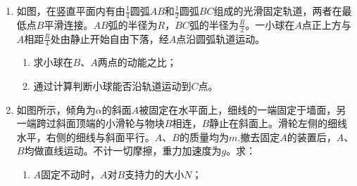 \begin{enumerate}[leftmargin=0em]
{\begin{enumerate}
\end{enumerate}


}



\newpage
\item 
{}
如图，在竖直平面内有由$ \frac{ 1 }{ 4 } $圆弧$ AB $和$ \frac{ 1 }{ 2 } $圆弧$ BC $组成的光滑固定轨道，两者在最低点$ B $平滑连接。$ AB $弧的半径为$ R $，$ BC $弧的半径为$ \frac{R}{2} $。一小球在$ A $点正上方与$ A $相距$ \frac{R}{4} $处由静止开始自由下落，经$ A $点沿圆弧轨道运动。
\begin{enumerate}
\renewcommand{\labelenumi}{\arabic{enumi}.}
\item
求小球在$ B $、$ A $两点的动能之比；
\item 
通过计算判断小球能否沿轨道运动到$ C $点。




\end{enumerate}
\begin{figure}[h!]
\flushright

\end{figure}





\item 
{}
如图所示，倾角为$ \alpha $的斜面$ A $被固定在水平面上，细线的一端固定于墙面，另一端跨过斜面顶端的小滑轮与物块$ B $相连，$ B $静止在斜面上。滑轮左侧的细线水平，右侧的细线与斜面平行。$ A $、$ B $的质量均为$ m $.撤去固定$ A $的装置后，$ A $、$ B $均做直线运动。不计一切摩擦，重力加速度为$ g $。求：
\begin{enumerate}
\renewcommand{\labelenumii}{(\arabic{enumii})}
\item 
$ A $固定不动时，$ A $对$ B $支持力的大小$ N $；



\end{enumerate}
\end{enumerate}
